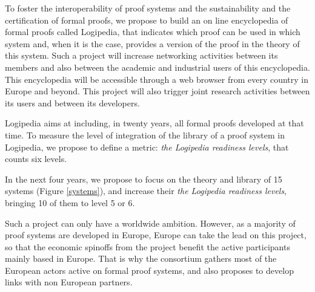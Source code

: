 To foster the interoperability of proof systems and the sustainability
and the certification of formal proofs, we propose to build an on line
encyclopedia of formal proofs called {\sc Logipedia}, that indicates
which proof can be used in which system and, when it is the case,
provides a version of the proof in the theory of this system.  Such a
project will increase networking activities between its members and
also between the academic and industrial users of this encyclopedia.
This encyclopedia will be accessible through a web browser from every
country in Europe and beyond. This project will also trigger joint
research activities between its users and between its developers.

{\sc Logipedia} aims at including, in twenty years, all formal proofs
developed at that time. To measure the level of integration of the
library of a proof system in {\sc Logipedia}, we propose to define a
metric: {\em the {\sc Logipedia} readiness levels}, that counts six
levels.

In the next four years, we propose to focus on the theory and library
of 15 systems (Figure \ref{systems}), and increase their {\em the {\sc
Logipedia} readiness levels}, bringing 10 of them to level 5 or 6.

Such a project can only have a worldwide ambition. However, as a
majority of proof systems are developed in Europe, Europe can take the
lead on this project, so that the economic spinoffs from the project
benefit the active participants mainly based in Europe.  That is why
the consortium gathers most of the European actors active on formal
proof systems, and also proposes to develop links with non European
partners.


